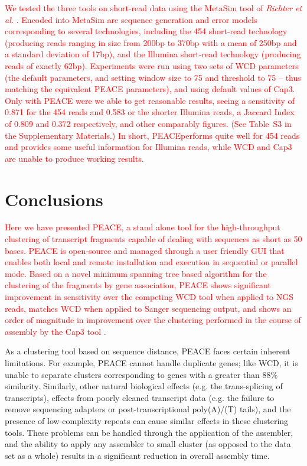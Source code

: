 \documentclass[a4,center,fleqn]{NAR}
\newcommand{\mc}[1]{\textcolor{red}{#1}}
\newcommand{\peace} {{\small PEACE}}
\newcommand{\wcd} {{\small WCD}}
\newcommand{\capthree} {{\small Cap3}}
\newcommand{\metasim} {{\small MetaSim}}
\begin{document}
\mc{We tested the three tools on short-read data using the \metasim\/
  tool of {\it Richter et al.} \cite{Richter2008}.  Encoded into
  \metasim\/ are sequence generation and error models corresponding to
  several technologies, including the 454 short-read technology
  (producing reads ranging in size from 200bp to 370bp with a mean of
  250bp and a standard deviation of 17bp), and the Illumina short-read
  technology (producing reads of exactly 62bp).  Experiments were run
  using two sets of \wcd\/ parameters (the default parameters, and
  setting window size to 75 and threshold to 75 -- thus matching the
  equivalent \peace\/ parameters), and using default values
  of \capthree.  Only with \peace\/ were we able to get reasonable
  results, seeing a sensitivity of 0.871 for the 454 reads and
  0.583 or the shorter Illumina reads, a Jaccard Index of 0.809 and
  0.372 respectively, and other comparably figures.  (See Table~S3 in
  the Supplementary Materials.)  In short, \peace performs quite well
  for 454 reads and provides some useful information for Illumina
  reads, while \wcd\/ and \capthree\/ are unable to produce working
  results.}

\section{Conclusions}

\mc{Here we have presented \peace, a stand alone tool for the
  high-throughput clustering of transcript fragments capable of
  dealing with sequences as short as 50 bases.  \peace\/ is
  open-source and managed through a user friendly GUI that enables
  both local and remote installation and execution in sequential or
  parallel mode.  Based on a novel minimum spanning tree based
  algorithm for the clustering of the fragments by gene association,
  \peace\/ shows significant improvement in sensitivity over the
  competing \wcd\/} \mc{tool} \cite{Hazelhurst08a} \mc{when} \mc{applied} \mc{to} \mc{NGS}
  \mc{reads,} \mc{matches} \mc{\wcd\/} \mc{when} \mc{applied} \mc{to} \mc{Sanger} \mc{sequencing}
  \mc{output,} \mc{and} \mc{shows} \mc{an} \mc{order} \mc{of} \mc{magnitude} \mc{in improvement over the
  clustering performed in the course of assembly by the \capthree\/
  tool \cite{Huang99}.}

As a clustering tool based on sequence distance, \peace\/ faces
certain inherent limitations. For example, \peace\/ cannot handle
duplicate genes; like \wcd\/, it is unable to separate clusters
corresponding to genes with a greater than 88\% similarity.
Similarly, other natural biological effects (e.g. the trans-splicing of
transcripts), effects from poorly cleaned transcript data (e.g. the
failure to remove sequencing adapters or post-transcriptional
poly(A)/(T) tails), and the presence of low-complexity repeats can
cause similar effects in these clustering tools.  These problems can be
handled through the application of the assembler, and the ability to
apply any assembler to small cluster (as opposed to the data set as a
whole) results in a significant reduction in overall assembly time.
\end{document}
